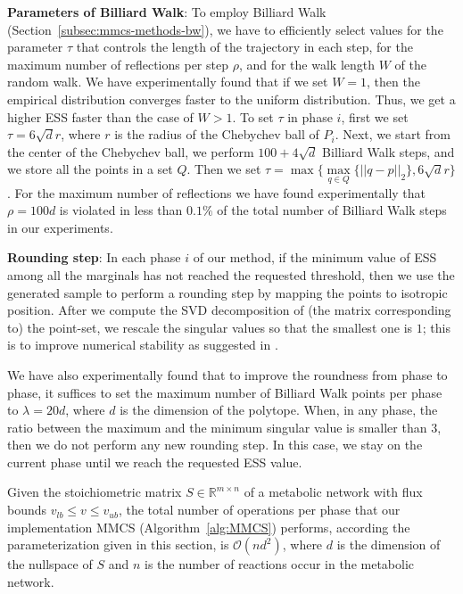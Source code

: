    \textbf{Parameters of Billiard Walk}: 
   To employ Billiard Walk (Section~\ref{subsec:mmcs-methods-bw}), we have to efficiently select values for the parameter $\tau$ that controls the length of the trajectory in each step, 
   for the maximum number of reflections per step $\rho$, and for the walk length $W$
   of the random walk. 
   We have experimentally found that if we set $W=1$, then  the empirical
   distribution converges faster to the uniform distribution. 
   Thus, we get a higher ESS faster than the case of $W>1$. To set $\tau$ in phase $i$, 
   first we set $\tau = 6\sqrt{d}r$, 
   where $r$ is the radius of the Chebychev ball of $P_i$.
   Next, we start from the center of the Chebychev ball, we perform
   $100 + 4\sqrt{d}$ Billiard Walk steps, and we store all the points in a set
   $Q$. Then we set
   $\tau = \max\{ \max\limits_{q\in Q}\{ ||q-p||_2 \}, 6\sqrt{d}r\}$. 
   For the maximum number of reflections we have found experimentally that
   $\rho = 100d$ is violated in less than $0.1\%$ of the total number of Billiard
   Walk steps in our experiments.


   \textbf{Rounding step}: 
   In each phase $i$ of our method, if the minimum value of
   ESS among all the marginals has not reached the requested threshold, then we use
   the generated sample to perform a rounding step by mapping the points to
   isotropic position. 
   After we compute the SVD decomposition of (the matrix corresponding to) the point-set, 
   we rescale the singular values so that the smallest one is $1$; 
   this is to improve numerical stability as suggested in \cite{Cousins15}.

   We have also experimentally found that to improve the roundness from phase to
   phase, it suffices to set the maximum number of Billiard Walk points per phase to
   $\lambda = 20d$, where $d$ is the dimension of the polytope. When, in any phase,
   the ratio between the maximum and the minimum singular value is smaller than
   $3$, then we do not perform any new rounding step. In this case, we stay on the
   current phase until we reach the requested ESS value.

   \begin{remark}
      Given the stoichiometric matrix
      $S\in\mathbb{R}^{m\times n}$ of a metabolic network with 
      flux bounds $v_{lb}\leq v\leq v_{ub}$, the total number of operations per phase that our implementation MMCS (Algorithm~\ref{alg:MMCS}) performs, according the parameterization given in this section, is $\mathcal{O}(nd^2)$, where $d$ is the dimension of the nullspace of $S$ and $n$ is the number of reactions occur in the metabolic network.
   \end{remark}
 
